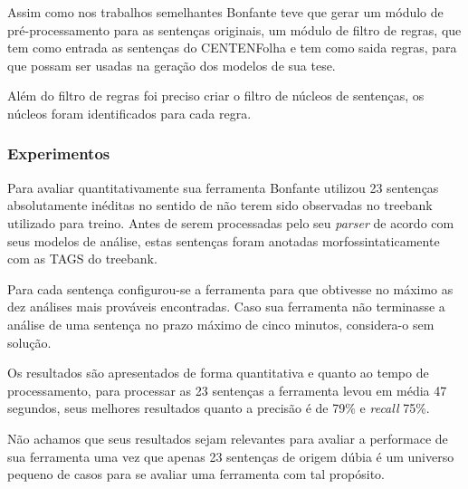 Assim como nos trabalhos semelhantes Bonfante teve que gerar um módulo de pré-processamento para as sentenças originais, um módulo de filtro de regras, que tem como entrada as sentenças do CENTENFolha e tem como saida regras, para que possam ser usadas na geração dos modelos de sua tese.

Além do filtro de regras foi preciso criar o filtro de núcleos de sentenças, os núcleos foram identificados para cada regra. 

\subsubsection{Experimentos} %
\label{sec:bonfante_experimentos}

Para avaliar quantitativamente sua ferramenta Bonfante utilizou 23 sentenças absolutamente inéditas no sentido de não terem sido observadas no treebank utilizado para treino. Antes de serem processadas pelo seu \emph{parser} de acordo com seus modelos de análise, estas sentenças foram anotadas morfossintaticamente com as TAGS do treebank.

Para cada sentença configurou-se a ferramenta para que obtivesse no máximo as dez análises mais prováveis encontradas. Caso sua ferramenta não terminasse a análise de uma sentença no prazo máximo de cinco minutos, considera-o sem solução.

Os resultados são apresentados de forma quantitativa e quanto ao tempo de processamento, para processar as 23 sentenças a ferramenta levou em média 47 segundos, seus melhores resultados quanto a precisão é de 79{\%} e \emph{recall} 75{\%}.

Não achamos que seus resultados sejam relevantes para avaliar a performace de sua ferramenta uma vez que apenas 23 sentenças de origem dúbia é um universo pequeno de casos para se avaliar uma ferramenta com tal propósito.





